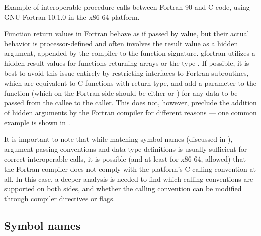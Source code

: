 \begin{listing}
	\inputminted{C}{src/f90/calls/csrc.c}
	\inputminted{Fortran}{src/f90/calls/fsrc.f90}
	\caption{Example of interoperable procedure calls between Fortran 90 and C code, using GNU Fortran 10.1.0 in the x86-64 platform.}
	\label{src:f90_calls}
\end{listing} 

Function return values in Fortran behave as if passed by value, but their actual behavior is processor-defined and often involves the result value as a hidden argument, appended by the compiler to the function signature. gfortran utilizes a hidden result values for functions returning arrays or the  type \cite{gfortranmanual}. If possible, it is best to avoid this issue entirely by restricting interfaces to Fortran subroutines, which are equivalent to C functions with  return type, and add a parameter to the function (which on the Fortran side should be either  or ) for any data to be passed from the callee to the caller. This does not, however, preclude the addition of hidden arguments by the Fortran compiler for different reasons --- one common example is shown in .

It is important to note that while matching symbol names (discussed in ), argument passing conventions and data type definitions is usually sufficient for correct interoperable calls, it is possible (and at least for x86-64, allowed) that the Fortran compiler does not comply with the platform's C calling convention at all. In this case, a deeper analysis is needed to find which calling conventions are supported on both sides, and whether the calling convention can be modified through compiler directives or flags.    

\subsection{Symbol names} \label{sec:interop_f90_names}

